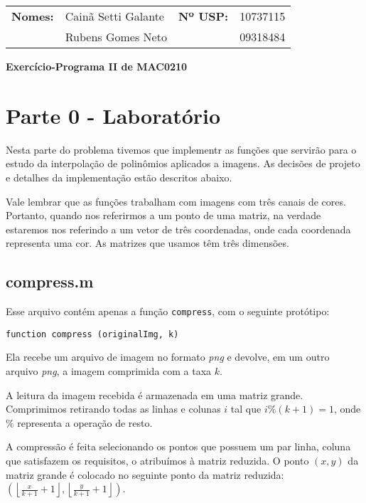 \documentclass[12pt,letterpaper]{article}
\begin{document}
	
	\begin{table}[]
		\centering
		\label{my-label}
		\begin{tabular}{llll}
			\textbf{Nomes:}&Cainã Setti Galante &   \textbf{Nº USP:} & 10737115 \\
			& Rubens Gomes Neto &         & 09318484 \\
		\end{tabular}
	\end{table}
	
	\begin{center}
		\huge \bf
		Exercício-Programa II de MAC0210 \\
	\end{center}
	
	\section{Parte 0 - Laboratório}
	
	Nesta parte do problema tivemos que implementr as funções que servirão para o estudo da interpolação de polinômios aplicados a imagens. As decisões de projeto e detalhes da implementação estão descritos abaixo. 
	
	Vale lembrar que as funções trabalham com imagens com três canais de cores. Portanto, quando nos referirmos a um ponto de uma matriz, na verdade estaremos nos referindo a um vetor de três coordenadas, onde cada coordenada representa uma cor. As matrizes que usamos têm três dimensões.
	
	\subsection{compress.m}
	
	Esse arquivo contém apenas a função \texttt{compress}, com o seguinte protótipo:
	
	\begin{center}
		\texttt{function compress (originalImg, k)}
	\end{center}
	
	Ela recebe um arquivo de imagem no formato \textit{png} e devolve, em um outro arquivo \textit{png}, a imagem comprimida com a taxa $k$.
	
	A leitura da imagem recebida é armazenada em uma matriz grande. Comprimimos retirando todas as linhas e colunas $i$ tal que $i\%(k+1)=1$, onde $\%$ representa a operação de resto.
	
	A compressão é feita selecionando os pontos que possuem um par linha, coluna que satisfazem os requisitos, o atribuímos à matriz reduzida. O ponto $(x, y)$ da matriz grande é colocado no seguinte ponto da matriz reduzida:  $(\left \lfloor{\frac{x}{k+1}+1}\right \rfloor, \left \lfloor{\frac{y}{k+1}+1}\right \rfloor)$.
	
\end{document}
